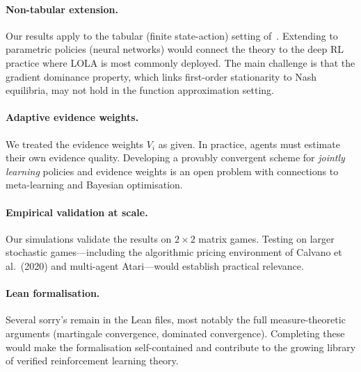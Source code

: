 \paragraph{Non-tabular extension.} Our results apply to the tabular (finite state-action) setting of~\cite{giannou2022}. Extending to parametric policies (neural networks) would connect the theory to the deep RL practice where LOLA is most commonly deployed. The main challenge is that the gradient dominance property, which links first-order stationarity to Nash equilibria, may not hold in the function approximation setting.

\paragraph{Adaptive evidence weights.} We treated the evidence weights $V_i$ as given. In practice, agents must estimate their own evidence quality. Developing a provably convergent scheme for \emph{jointly learning} policies and evidence weights is an open problem with connections to meta-learning and Bayesian optimisation.

\paragraph{Empirical validation at scale.} Our simulations validate the results on $2 \times 2$ matrix games. Testing on larger stochastic games---including the algorithmic pricing environment of Calvano et al.~(2020) and multi-agent Atari---would establish practical relevance.

\paragraph{Lean formalisation.} Several sorry's remain in the Lean files, most notably the full measure-theoretic arguments (martingale convergence, dominated convergence). Completing these would make the formalisation self-contained and contribute to the growing library of verified reinforcement learning theory.
